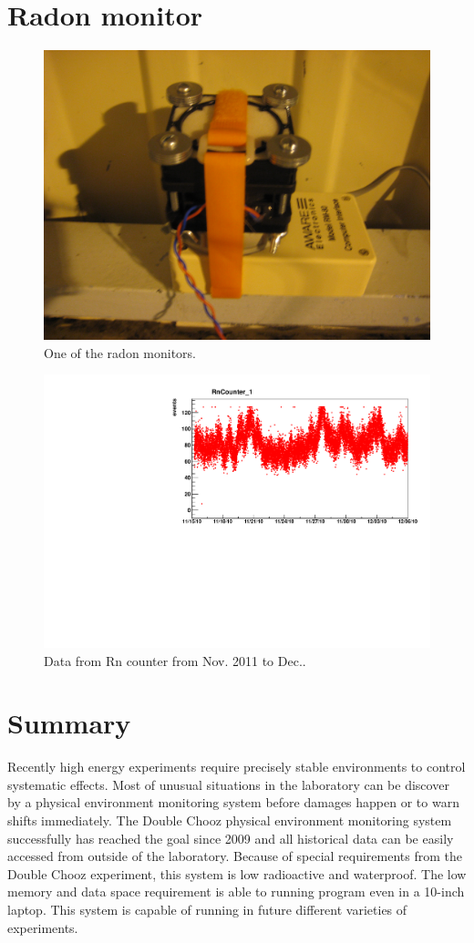 \documentclass{JINST}
\begin{document}
\section{Radon monitor}








\begin{figure}
\centering
\includegraphics[width=.6\textwidth]{IMG_3817.JPG}
\caption{One of the radon monitors.}
\label{fig16}
\end{figure}

\begin{figure}
\centering
\includegraphics[width=.6\textwidth]{RnCounter01_2010-11-15to2010-12-6.pdf}
\caption{Data from Rn counter from Nov. 2011 to Dec..}
\label{fig17}
\end{figure}
\section{Summary}
Recently high energy experiments require precisely stable environments to control systematic effects. Most of unusual situations in the laboratory can be discover by a physical environment monitoring system before damages happen or to warn shifts immediately. The Double Chooz physical environment monitoring system successfully has reached the goal since 2009 and all historical data can be easily accessed from outside of the laboratory. Because of special requirements from the Double Chooz experiment, this system is low radioactive and waterproof. The low memory and data space requirement is able to running program even in a 10-inch laptop. This system is capable of running in future different varieties of experiments.
\acknowledgments
\end{document}
